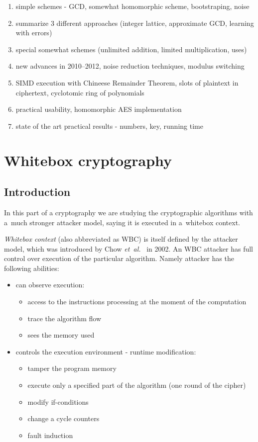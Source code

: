 \documentclass[11pt,oneside,final]{fithesis2}
\begin{document}
\begin{enumerate}
    
     \item simple schemes - GCD, somewhat homomorphic scheme, bootstraping, noise
     \item summarize 3 different approaches (integer lattice, approximate GCD, learning with errors)
     \item special somewhat schemes (unlimited addition, limited multiplication, uses)
     \item new advances in 2010--2012, noise reduction techniques, modulus switching
     \item SIMD execution with Chineese Remainder Theorem, slots of plaintext in ciphertext, cyclotomic ring of polynomials
     \item practical usability, homomorphic AES implementation
     \item state of the art practical results - numbers, key, running time
    \end{enumerate}

\chapter{Whitebox cryptography}
    
    \section{Introduction}    
    In this part of a cryptography we are studying the cryptographic algorithms with a~much stronger attacker model, saying it is executed in a~whitebox context. 

    \emph{Whitebox context} (also abbreviated as WBC) is itself defined by the attacker model, which was introduced by Chow \emph{et~al.}~\citep{Chow02white-boxcryptography} in 2002.
    An WBC attacker has full control over execution of the particular algorithm. Namely attacker has the following abilities:
    
    \begin{itemize}
	\item can observe execution:
	\begin{itemize}
	    \item access to the instructions processing at the moment of the computation
	    \item trace the algorithm flow
	    \item sees the memory used
	\end{itemize}
	\item controls the execution environment - runtime modification:
	\begin{itemize}
	    \item tamper the program memory
	    \item execute only a specified part of the algorithm (one round of the cipher)
	    \item modify if-conditions
	    \item change a cycle counters
	    \item fault induction
	\end{itemize}
    \end{itemize}
    
\end{document}
